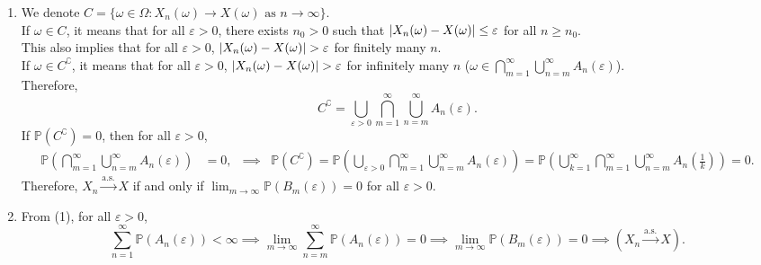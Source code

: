 \documentclass{huhtakm-template-book-v2}
\newcommand{\prob}{\mathbb{P}}
\begin{document}
    \begin{proofing}
        \begin{enumerate}
            \item We denote $C = \{\omega \in \Omega:X_{n}(\omega) \to X(\omega) \text{ as } n \to \infty\}$.\\
            If $\omega \in C$, it means that for all $\varepsilon > 0$, there exists $n_{0} > 0$ such that $\left|{X_{n}(\omega)-X(\omega)}\right| \leq \varepsilon$ for all $n \geq n_{0}$.\\
            This also implies that for all $\varepsilon > 0$, $\left|{X_{n}(\omega)-X(\omega)}\right| > \varepsilon$ for finitely many $n$.\\
            If $\omega \in C^{\complement}$, it means that for all $\varepsilon > 0$, $\left|{X_{n}(\omega)-X(\omega)}\right| > \varepsilon$ for infinitely many $n$ ($\omega \in \bigcap_{m = 1}^{\infty}\bigcup_{n = m}^{\infty}A_{n}(\varepsilon)$).\\
            Therefore,
            \begin{equation*}
                C^{\complement} = \bigcup_{\varepsilon > 0}\bigcap_{m = 1}^{\infty}\bigcup_{n = m}^{\infty}A_{n}(\varepsilon).
            \end{equation*}
            If $\prob(C^{\complement}) = 0$, then for all $\varepsilon > 0$,
            \begin{align*}
                \prob\left(\bigcap_{m = 1}^{\infty}\bigcup_{n = m}^{\infty}A_{n}(\varepsilon)\right) &= 0, & \implies & \prob(C^{\complement}) = \prob\left(\bigcup_{\varepsilon > 0}\bigcap_{m = 1}^{\infty}\bigcup_{n = m}^{\infty}A_{n}(\varepsilon)\right) = \prob\left(\bigcup_{k = 1}^{\infty}\bigcap_{m = 1}^{\infty}\bigcup_{n = m}^{\infty}A_{n}\left(\frac{1}{k}\right)\right) = 0.
            \end{align*}
            Therefore, $X_{n} \xrightarrow{\text{a.s.}} X$ if and only if $\lim_{m \to \infty}\prob(B_{m}(\varepsilon)) = 0$ for all $\varepsilon > 0$.
            \item From (1), for all $\varepsilon > 0$,
            \begin{equation*}
                \sum_{n = 1}^{\infty}\prob(A_{n}(\varepsilon)) < \infty \implies \lim_{m \to \infty}\sum_{n = m}^{\infty}\prob(A_{n}(\varepsilon)) = 0 \implies \lim_{m \to \infty}\prob(B_{m}(\varepsilon)) = 0 \implies (X_{n} \xrightarrow{\text{a.s.}} X).
            \end{equation*}
        \end{enumerate}
    \end{proofing}
    \newpage
\end{document}
